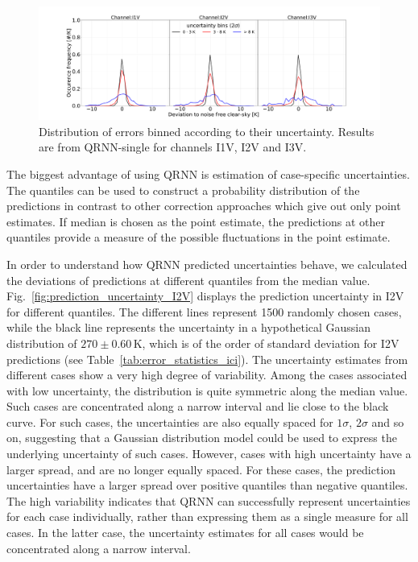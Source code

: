 \documentclass[amt, manuscript]{copernicus}
\begin{document}
\begin{figure}[t]
	\includegraphics[width=\textwidth]{Figures/PDF_uncertainty_bins_QRNN-single.pdf}	
	\caption{Distribution of errors binned according to their uncertainty. Results are from QRNN-single for channels I1V, I2V and I3V.}
	\label{fig:error_distribution_uncertainty_bins}	
\end{figure}

The biggest advantage of using QRNN is estimation of case-specific uncertainties. The quantiles can be used to construct a probability distribution of the predictions in contrast to other correction approaches which give out only point estimates. If median is chosen as the point estimate, the predictions at other quantiles provide a measure of the possible fluctuations in the point estimate. 

In order to understand how QRNN predicted uncertainties behave, we calculated the deviations of predictions at different quantiles from the median value. Fig.~\ref{fig:prediction_uncertainty_I2V} displays the prediction uncertainty in I2V for different quantiles. The different lines represent 1500 randomly chosen cases, while the black line represents the uncertainty in a hypothetical Gaussian distribution of $270\pm0.60$\,K, which is of the order of standard deviation for I2V predictions (see Table~\ref{tab:error_statistics_ici}). The uncertainty estimates from different cases show a very high degree of variability. Among the cases associated with low uncertainty, the distribution is quite symmetric along the median value. Such cases are concentrated along a narrow interval and lie close to the black curve. For such cases, the uncertainties are also equally spaced for $1\sigma$, $2\sigma$ and so on, suggesting that a Gaussian distribution model could be used to express the underlying uncertainty of such cases. However, cases with high uncertainty have a larger spread, and are no longer equally spaced. For these cases, the prediction uncertainties have a larger spread over positive quantiles than negative quantiles.  The high variability indicates that QRNN can successfully represent uncertainties for each case individually, rather than expressing them as a single measure for all cases. In the latter case, the uncertainty estimates for all cases would be concentrated along a narrow interval. 
\end{document}
